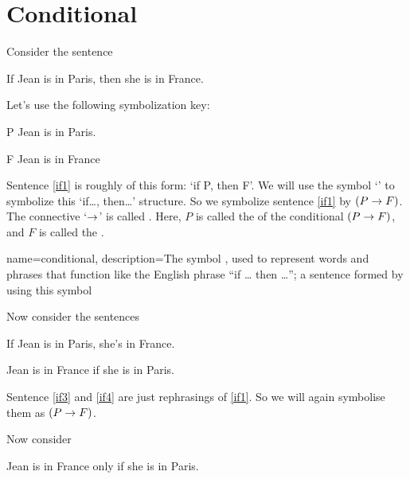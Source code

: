\section{Conditional}
Consider the sentence
	\begin{earg}
		\item[\ex{if1}] If Jean is in Paris, then she is in France.
	\end{earg}
Let's use the following symbolization key:
	\begin{ekey}
		\item[P] Jean is in Paris.
		\item[F] Jean is in France
	\end{ekey}
Sentence \ref{if1} is roughly of this form: `if P, then F'. We will use the symbol `\eif' to symbolize this `if\ldots, then\ldots' structure. So we symbolize sentence \ref{if1} by $(P\rightarrow F)$. 	The connective `$\rightarrow$' is called . Here, $P$ is called the  of the conditional $(P \rightarrow F)$, and $F$ is called the .




{
name=conditional,
description={The symbol \eif, used to represent words and phrases that function like the English phrase ``if \dots{} then \dots''; a sentence formed by using this symbol}
}


\noindent Now consider the sentences
\begin{earg}
		\item[\ex{if3}] If Jean is in Paris, she's in France.
		\item[\ex{if4}] Jean is in France if she is in Paris.
\end{earg}


Sentence \ref{if3} and \ref{if4} are just rephrasings of \ref{if1}. So we will again symbolise them as $(P\rightarrow F)$.

Now consider
\begin{earg}
		\item[\ex{if2}] Jean is in France only if she is in Paris.
\end{earg}

